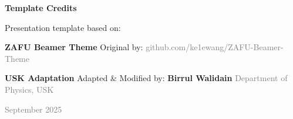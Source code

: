 \documentclass{beamer}
\def\\{}%
\begin{document}
\begin{frame}{}
  \vfill
  \begin{center}
    {\Large \textcolor{uskGold}{\textbf{Template Credits}}}
    
    \vspace{1.5em}
    
    {\large Presentation template based on:}
    
    \vspace{1em}
    
    {\LARGE \textbf{ZAFU Beamer Theme}}\\
    \vspace{0.5em}
    {\normalsize Original by: \textcolor{gray}{github.com/ke1ewang/ZAFU-Beamer-Theme}}
    
    \vspace{1.5em}
    
    {\large \textcolor{uskGold}{\textbf{USK Adaptation}}}\\
    \vspace{0.5em}
    {\normalsize Adapted \& Modified by: \textbf{Birrul Walidain}}\\
    {\small \textcolor{gray}{Department of Physics, USK}}
    
    \vspace{1em}
    
    {\small \textcolor{gray}{September 2025}}
  \end{center}
  \vfill
\end{frame}
\end{document}
